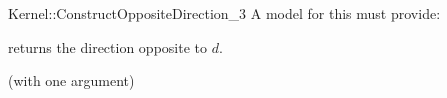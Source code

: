 \begin{ccRefFunctionObjectConcept}{Kernel::ConstructOppositeDirection_3}
A model for this must provide:


 {returns the direction opposite to $d$.}

\ccRefines
{} (with one argument)

\ccSeeAlso
{} \\

\end{ccRefFunctionObjectConcept}
